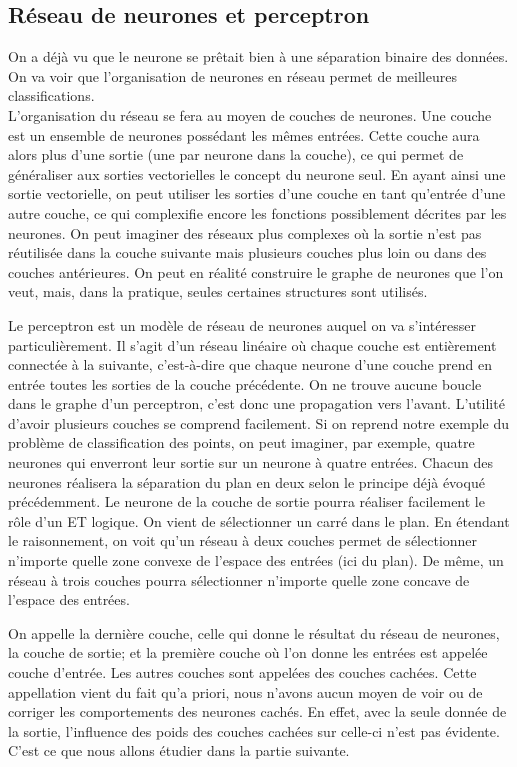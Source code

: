 \subsection{Réseau de neurones et perceptron} %
\label{sub:reseau_de_neurones}
On a déjà vu que le neurone se prêtait bien à une séparation binaire des données. On va voir que l’organisation de neurones en réseau permet de meilleures classifications.\\
L’organisation du réseau se fera au moyen de couches de neurones. Une couche est un ensemble de neurones possédant les mêmes entrées. Cette couche aura alors plus d'une sortie (une par neurone dans la couche), ce qui permet de généraliser aux sorties vectorielles le concept du neurone seul. En ayant ainsi une sortie vectorielle, on peut utiliser les sorties d'une couche en tant qu'entrée d'une autre couche, ce qui complexifie encore les fonctions possiblement décrites par les neurones.
On peut imaginer des réseaux plus complexes où la sortie n'est pas réutilisée dans la couche suivante mais plusieurs couches plus loin ou dans des couches antérieures. On peut en réalité construire le graphe de neurones que l'on veut, mais, dans la pratique, seules certaines structures sont utilisés. 


Le perceptron est un modèle de réseau de neurones auquel on va s’intéresser particulièrement. Il s'agit d'un réseau linéaire où chaque couche est entièrement connectée à la suivante, c'est-à-dire que chaque neurone d'une couche prend en entrée toutes les sorties de la couche précédente. On ne trouve aucune boucle dans le graphe d'un perceptron, c'est donc une propagation vers l'avant.
L’utilité d’avoir plusieurs couches se comprend facilement. Si on reprend notre exemple du problème de classification des points, on peut imaginer, par exemple, quatre neurones qui enverront leur sortie sur un neurone à quatre entrées. Chacun des neurones réalisera la séparation du plan en deux selon le principe déjà évoqué précédemment. Le neurone de la couche de sortie pourra réaliser facilement le rôle d’un ET logique. On vient de sélectionner un carré dans le plan. En étendant le raisonnement, on voit qu’un réseau à deux couches permet de sélectionner n’importe quelle zone convexe de l’espace des entrées (ici du plan). De même, un réseau à trois couches pourra sélectionner n’importe quelle zone concave de l’espace des entrées.

On appelle la dernière couche, celle qui donne le résultat du réseau de neurones, la couche de sortie; et la première couche où l'on donne les entrées est appelée couche d'entrée. Les autres couches sont appelées des couches cachées. Cette appellation vient du fait qu’a priori, nous n’avons aucun moyen de voir ou de corriger les comportements des neurones cachés. En effet, avec la seule donnée de la sortie, l’influence des poids des couches cachées sur celle-ci n'est pas évidente. C'est ce que nous allons étudier dans la partie suivante. 




